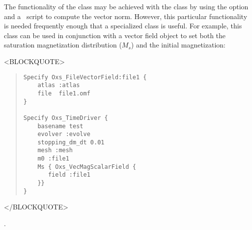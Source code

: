 \begin{description}
The functionality of the  class may be achieved
with the  class by using the
 option and a \Tcl\ script to compute the vector
norm.  However, this particular functionality is needed frequently
enough that a specialized class is useful.  For example, this class can
be used in conjunction with a vector field object to set
both the saturation magnetization distribution ($M_s$) and the initial
magnetization:
\begin{rawhtml}
<BLOCKQUOTE>
\end{rawhtml}
\begin{quote}
\begin{verbatim}
Specify Oxs_FileVectorField:file1 {
    atlas :atlas
    file  file1.omf
}

Specify Oxs_TimeDriver {
    basename test
    evolver :evolve
    stopping_dm_dt 0.01
    mesh :mesh
    m0 :file1
    Ms { Oxs_VecMagScalarField {
       field :file1
    }}
}
\end{verbatim}
\end{quote}
\begin{rawhtml}
</BLOCKQUOTE>
\end{rawhtml}

\begin{ExampleMifs}[Example]
  .
\end{ExampleMifs}


\end{description}
